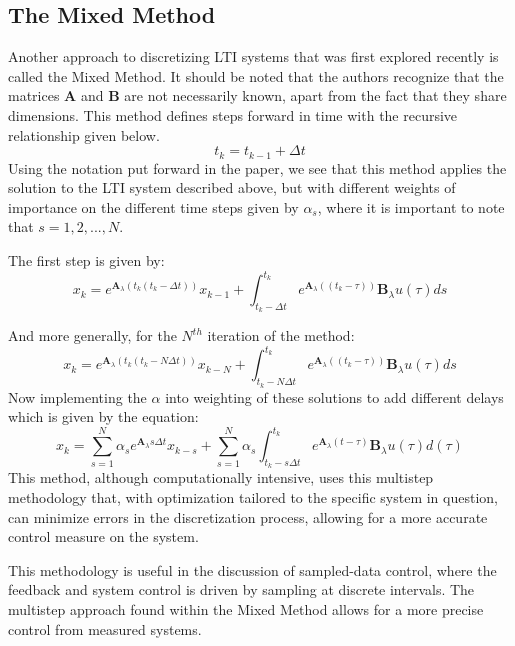 \documentclass{article}
\begin{document}
\subsection{The Mixed Method}
Another approach to discretizing LTI systems that was first explored recently is called the Mixed Method. It should be noted that the authors recognize that the matrices $\bm{A}$ and $\bm{B}$ are not necessarily known, apart from the fact that they share dimensions. This method defines steps forward in time with the recursive relationship given below. \cite{keles2024}
\begin{equation}
    t_k = t_{k-1} + \Delta t
\end{equation}
Using the notation put forward in the paper, we see that this method applies the solution to the LTI system described above, but with different weights of importance on the different time steps given by $\alpha_s$, where it is important to note that $s=1,2,...,N$.

The first step is given by:
\begin{equation}
    x_k=e^{\bm{A}_{\lambda}(t_k(t_k-\Delta t))}x_{k-1}+\int_{t_k-\Delta t}^{t_k}e^{\bm{A}_{\lambda}((t_k-\tau))}\bm{B}_\lambda u(\tau)ds
\end{equation}

And more generally, for the $N^{th}$ iteration of the method:
\begin{equation}
    x_k=e^{\bm{A}_{\lambda}(t_k(t_k-N\Delta t))}x_{k-N}+\int_{t_k-N\Delta t}^{t_k}e^{\bm{A}_{\lambda}((t_k-\tau))}\bm{B}_\lambda u(\tau)ds
\end{equation}
Now implementing the $\alpha$ into weighting of these solutions to add different delays which is given by the equation:
\begin{equation}
    x_k=\sum_{s=1}^{N} \alpha_s e^{\bm{A}_\lambda s \Delta t}x_{k-s} + \sum_{s=1}^{N} \alpha_s \int_{t_k -s \Delta t}^{t_k} e^{\bm{A}_\lambda (t-\tau)}\bm{B}_\lambda u(\tau) d(\tau)
\end{equation}
This method, although computationally intensive, uses this multistep methodology that, with optimization tailored to the specific system in question, can minimize errors in the discretization process, allowing for a more accurate control measure on the system.

This methodology is useful in the discussion of sampled-data control, where the feedback and system control is driven by sampling at discrete intervals. The multistep approach found within the Mixed Method allows for a more precise control from measured systems.
\end{document}

